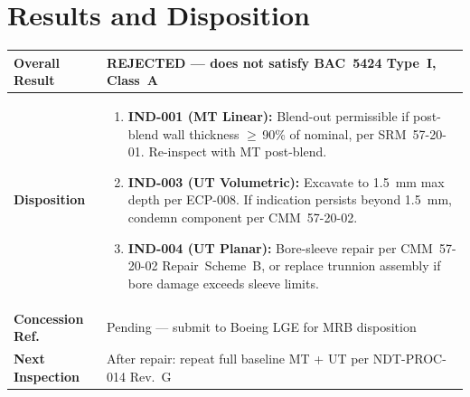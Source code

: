 \section{Results and Disposition}
\begin{tabularx}{\linewidth}{@{}>{\color{primary}\bfseries}l@{\hspace{8mm}}>{\raggedright\arraybackslash}X@{}}
  \toprule
  Overall Result     & \textcolor{fail}{\textbf{REJECTED}} --- does not satisfy BAC~5424 Type~I, Class~A \\
  \midrule
  Disposition &
    \begin{enumerate}[leftmargin=*, itemsep=2pt, topsep=2pt]
      \item \textbf{IND-001 (MT Linear):} Blend-out permissible if post-blend wall thickness
            $\geq$\,90\% of nominal, per SRM~57-20-01. Re-inspect with MT post-blend.
      \item \textbf{IND-003 (UT Volumetric):} Excavate to 1.5~mm max depth per ECP-008. If
            indication persists beyond 1.5~mm, condemn component per CMM~57-20-02.
      \item \textbf{IND-004 (UT Planar):} Bore-sleeve repair per CMM~57-20-02 Repair~Scheme~B,
            or replace trunnion assembly if bore damage exceeds sleeve limits.
    \end{enumerate} \\
  \midrule
  Concession Ref.    & Pending --- submit to Boeing LGE for MRB disposition \\
  Next Inspection    & After repair: repeat full baseline MT + UT per NDT-PROC-014 Rev.~G \\
  \bottomrule
\end{tabularx}

